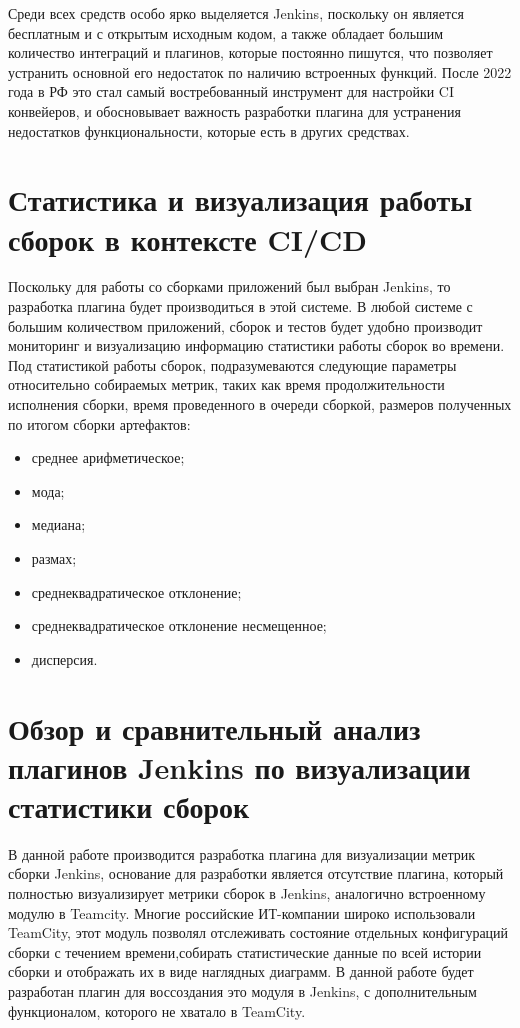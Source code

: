 Среди всех средств особо ярко выделяется Jenkins, поскольку он является бесплатным и с открытым исходным кодом, а также обладает большим количество интеграций и плагинов, которые постоянно пишутся, что позволяет устранить основной его недостаток по наличию встроенных функций. После 2022 года в РФ это стал самый востребованный инструмент для настройки CI конвейеров, и обосновывает важность разработки плагина для устранения недостатков функциональности, которые есть в других средствах.
 
 
 \section{Статистика и визуализация работы сборок в контексте CI/CD} \label{ch1:sec4}
 
Поскольку для работы со сборками приложений был выбран Jenkins, то разработка плагина будет производиться в этой системе. В любой системе с большим количеством приложений, сборок и тестов будет удобно производит мониторинг и визуализацию информацию статистики работы сборок во времени. Под статистикой работы сборок, подразумеваются следующие параметры относительно собираемых метрик, таких как время продолжительности исполнения сборки, время проведенного в очереди сборкой, размеров полученных по итогом сборки артефактов:
 
\begin{itemize}
	\item среднее арифметическое;
	\item мода;
	\item медиана;
	\item размах;
	\item среднеквадратическое отклонение;
	\item среднеквадратическое отклонение несмещенное;
	\item дисперсия.
\end{itemize}
 
	
\section{Обзор и сравнительный анализ плагинов Jenkins по визуализации статистики сборок} \label{ch1:sec5}

В данной работе производится разработка плагина для визуализации метрик сборки Jenkins, основание для разработки является отсутствие плагина, который полностью визуализирует метрики сборок в Jenkins, аналогично встроенному модулю в Teamcity. Многие российские ИТ-компании широко использовали TeamCity, этот модуль позволял отслеживать состояние отдельных конфигураций сборки с течением времени,собирать статистические данные по всей истории сборки и отображать их в виде наглядных диаграмм. В данной работе будет разработан плагин для воссоздания это модуля в Jenkins, с дополнительным функционалом, которого не хватало в TeamCity.

